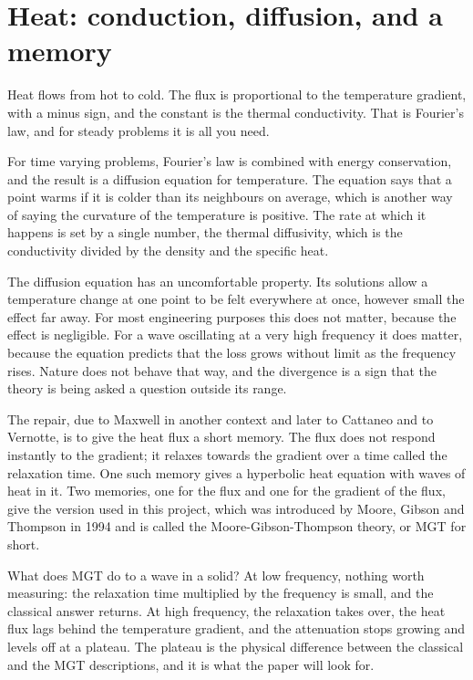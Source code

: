 \documentclass[11pt]{article}
\begin{document}
\section{Heat: conduction, diffusion, and a memory}

Heat flows from hot to cold. The flux is proportional to the temperature gradient, with a minus sign, and the
constant is the thermal conductivity. That is Fourier's law, and for steady problems it is all you need.

For time varying problems, Fourier's law is combined with energy conservation, and the result is a diffusion
equation for temperature. The equation says that a point warms if it is colder than its neighbours on average,
which is another way of saying the curvature of the temperature is positive. The rate at which it happens is
set by a single number, the thermal diffusivity, which is the conductivity divided by the density and the
specific heat.

The diffusion equation has an uncomfortable property. Its solutions allow a temperature change at one point
to be felt everywhere at once, however small the effect far away. For most engineering purposes this does not
matter, because the effect is negligible. For a wave oscillating at a very high frequency it does matter,
because the equation predicts that the loss grows without limit as the frequency rises. Nature does not
behave that way, and the divergence is a sign that the theory is being asked a question outside its range.

The repair, due to Maxwell in another context and later to Cattaneo and to Vernotte, is to give the heat flux
a short memory. The flux does not respond instantly to the gradient; it relaxes towards the gradient over a
time called the relaxation time. One such memory gives a hyperbolic heat equation with waves of heat in it.
Two memories, one for the flux and one for the gradient of the flux, give the version used in this project,
which was introduced by Moore, Gibson and Thompson in 1994 and is called the Moore-Gibson-Thompson theory,
or MGT for short.

What does MGT do to a wave in a solid? At low frequency, nothing worth measuring: the relaxation time
multiplied by the frequency is small, and the classical answer returns. At high frequency, the relaxation
takes over, the heat flux lags behind the temperature gradient, and the attenuation stops growing and levels
off at a plateau. The plateau is the physical difference between the classical and the MGT descriptions, and
it is what the paper will look for.
\end{document}
